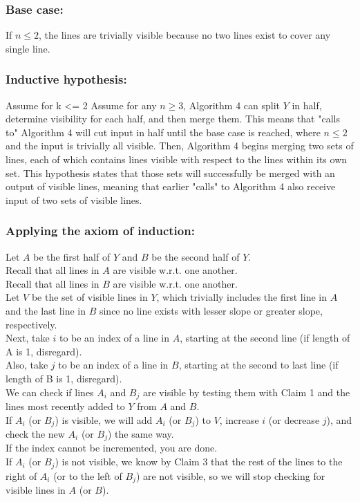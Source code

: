 \documentclass{article}
\begin{document}
    \subsubsection*{Base case:}
    If $n \leq 2$, the lines are trivially visible because no two lines exist to cover any single line.
    \subsubsection*{Inductive hypothesis:}
    Assume for k <= 2
    Assume for any $n \geq 3$, Algorithm 4 can split $Y$ in half, determine visibility for each half, and then merge them. This means that "calls to" Algorithm 4 will cut input in half until the base case is reached, where $n \leq 2$ and the input is trivially all visible. Then, Algorithm 4 begins merging two sets of lines, each of which contains lines visible with respect to the lines within its own set. This hypothesis states that those sets will successfully be merged with an output of visible lines, meaning that earlier "calls" to Algorithm 4 also receive input of two sets of visible lines. 
    \subsubsection*{Applying the axiom of induction:}
    Let $A$ be the first half of $Y$ and $B$ be the second half of $Y$.\\
    Recall that all lines in $A$ are visible w.r.t. one another.\\
    Recall that all lines in $B$ are visible w.r.t. one another.\\
    Let $V$ be the set of visible lines in $Y$, which trivially includes the first line in $A$ and the last line in $B$ since no line exists with lesser slope or greater slope, respectively.\\
    Next, take $i$ to be an index of a line in $A$, starting at the second line (if length of A is 1, disregard).\\
    Also, take $j$ to be an index of a line in $B$, starting at the second to last line (if length of B is 1, disregard).\\
    We can check if lines $A_{i}$ and $B_{j}$ are visible by testing them with Claim 1 and the lines most recently added to $Y$ from $A$ and $B$.\\
    If $A_{i}$ (or $B_{j}$) is visible, we will add $A_{i}$ (or $B_{j}$) to $V$, increase $i$ (or decrease $j$), and check the new $A_{i}$ (or $B_{j}$) the same way.\\
    If the index cannot be incremented, you are done.\\
    If $A_{i}$ (or $B_{j}$) is not visible, we know by Claim 3 that the rest of the lines to the right of $A_{i}$ (or to the left of $B_{j}$) are not visible, so we will stop checking for visible lines in $A$ (or $B$).
\end{document}
